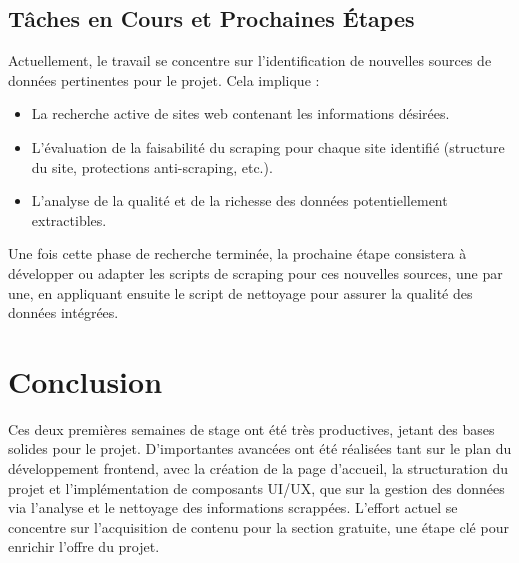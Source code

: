 \documentclass[12pt, a4paper]{article}
\begin{document}
\subsection{Tâches en Cours et Prochaines Étapes}

Actuellement, le travail se concentre sur l'identification de nouvelles sources de données pertinentes pour le projet. Cela implique :
\begin{itemize}
    \item La recherche active de sites web contenant les informations désirées.
    \item L'évaluation de la faisabilité du scraping pour chaque site identifié (structure du site, protections anti-scraping, etc.).
    \item L'analyse de la qualité et de la richesse des données potentiellement extractibles.
\end{itemize}
Une fois cette phase de recherche terminée, la prochaine étape consistera à développer ou adapter les scripts de scraping pour ces nouvelles sources, une par une, en appliquant ensuite le script de nettoyage pour assurer la qualité des données intégrées.

\section{Conclusion}
Ces deux premières semaines de stage ont été très productives, jetant des bases solides pour le projet. D'importantes avancées ont été réalisées tant sur le plan du développement frontend, avec la création de la page d'accueil, la structuration du projet et l'implémentation de composants UI/UX, que sur la gestion des données via l'analyse et le nettoyage des informations scrappées. L'effort actuel se concentre sur l'acquisition de contenu pour la section gratuite, une étape clé pour enrichir l'offre du projet.
\end{document}
